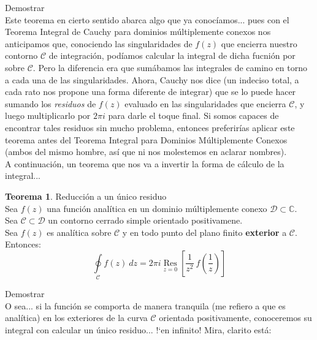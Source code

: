 \documentclass[12pt]{article}
\theoremstyle{definition}
\theoremstyle{theorem}
\newtheorem{theorem}{Teorema}[section]
\theoremstyle{corolary}
\theoremstyle{method}
\DeclareMathOperator*{\Res}{Res}
\begin{document}
Demostrar\\

Este teorema en cierto sentido abarca algo que ya conoc\'iamos... pues con el Teorema Integral de Cauchy para dominios m\'ultiplemente conexos nos anticipamos que, conociendo las singularidades de $f(z)$ que encierra nuestro contorno $\mathcal{C}$ de integraci\'on, pod\'iamos calcular la integral de dicha fucni\'on por sobre $\mathcal{C}$. Pero la diferencia era que sum\'abamos las integrales de camino en torno a cada una de las singularidades. Ahora, Cauchy nos dice (un indeciso total, a cada rato nos propone una forma diferente de integrar) que se lo puede hacer sumando los \textit{residuos} de $f(z)$ evaluado en las singularidades que encierra $\mathcal{C}$, y luego multiplicarlo por $2\pi i$ para darle el toque final. Si somos capaces de encontrar tales residuos sin mucho problema, entonces preferir\'ias aplicar este teorema antes del Teorema Integral para Dominios M\'ultiplemente Conexos (ambos del mismo hombre, as\'i que ni nos molestemos en aclarar nombres).\\

A continuaci\'on, un teorema que nos va a invertir la forma de c\'alculo de la integral...\\

\colorbox{brown!40!white!80}{\parbox{\linewidth}{
\theoremstyle{theorem}
\begin{theorem} {Reducci\'on a un \'unico residuo}\\

Sea $f(z)$ una funci\'on anal\'itica en un dominio m\'ultiplemente conexo $\mathcal{D}\subset \mathbb{C}$. \\
Sea $\mathcal{C}\subset \mathcal{D}$ un contorno cerrado simple orientado positivamene. \\
Sea $f(z)$ es anal\'itica sobre $\mathcal{C}$ y en todo punto del plano finito \textbf{exterior} a $\mathcal{C}$.\\
Entonces: $$\oint\limits_{\mathcal{C}}f(z)\ dz = 2\pi i \Res\limits_{z=0}\left[\frac{1}{z^2}\ f\left(\frac{1}{z}\right)\right]$$
\end{theorem}}}
\linebreak

Demostrar\\

O sea... si la funci\'on se comporta de manera tranquila (me refiero a que es anal\'itica) en los exteriores de la curva $\mathcal{C}$ orientada positivamente, conoceremos su integral con calcular un \'unico residuo... !`en infinito! Mira, clarito est\'a:
\end{document}
